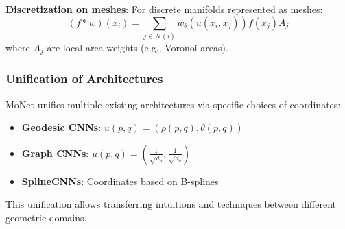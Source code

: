 \textbf{Discretization on meshes}: For discrete manifolds represented as meshes:
\begin{equation}
(f * w)(x_i) = \sum_{j \in \mathcal{N}(i)} w_\theta(u(x_i, x_j)) f(x_j) A_j
\end{equation}
where $A_j$ are local area weights (e.g., Voronoi areas).

\subsubsection{Unification of Architectures}

MoNet unifies multiple existing architectures via specific choices of coordinates:

\begin{itemize}
    \item \textbf{Geodesic CNNs}: $u(p,q) = (\rho(p,q), \theta(p,q))$
    \item \textbf{Graph CNNs}: $u(p,q) = (\frac{1}{\sqrt{d_p}}, \frac{1}{\sqrt{d_q}})$
    \item \textbf{SplineCNNs}: Coordinates based on B-splines
\end{itemize}

This unification allows transferring intuitions and techniques between different geometric domains.

